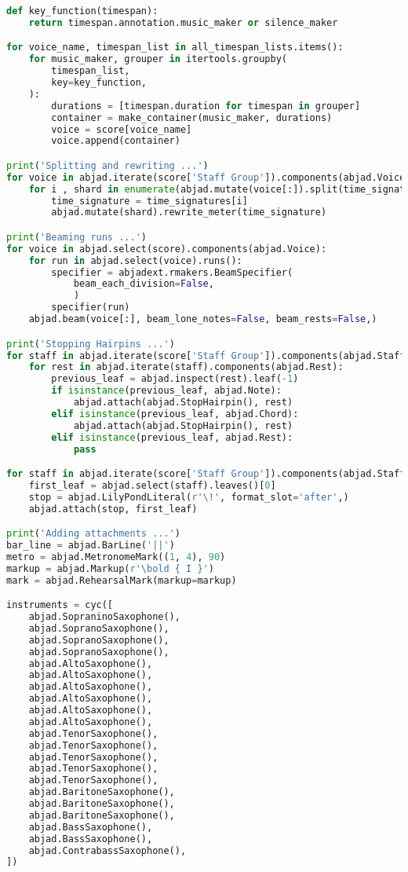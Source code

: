 \begin{lstlisting}[language=Python, caption=Invocation Source Code]
def key_function(timespan):
    return timespan.annotation.music_maker or silence_maker

for voice_name, timespan_list in all_timespan_lists.items():
    for music_maker, grouper in itertools.groupby(
        timespan_list,
        key=key_function,
    ):
        durations = [timespan.duration for timespan in grouper]
        container = make_container(music_maker, durations)
        voice = score[voice_name]
        voice.append(container)

print('Splitting and rewriting ...')
for voice in abjad.iterate(score['Staff Group']).components(abjad.Voice):
    for i , shard in enumerate(abjad.mutate(voice[:]).split(time_signatures)):
        time_signature = time_signatures[i]
        abjad.mutate(shard).rewrite_meter(time_signature)

print('Beaming runs ...')
for voice in abjad.select(score).components(abjad.Voice):
    for run in abjad.select(voice).runs():
        specifier = abjadext.rmakers.BeamSpecifier(
            beam_each_division=False,
            )
        specifier(run)
    abjad.beam(voice[:], beam_lone_notes=False, beam_rests=False,)

print('Stopping Hairpins ...')
for staff in abjad.iterate(score['Staff Group']).components(abjad.Staff):
    for rest in abjad.iterate(staff).components(abjad.Rest):
        previous_leaf = abjad.inspect(rest).leaf(-1)
        if isinstance(previous_leaf, abjad.Note):
            abjad.attach(abjad.StopHairpin(), rest)
        elif isinstance(previous_leaf, abjad.Chord):
            abjad.attach(abjad.StopHairpin(), rest)
        elif isinstance(previous_leaf, abjad.Rest):
            pass

for staff in abjad.iterate(score['Staff Group']).components(abjad.Staff):
    first_leaf = abjad.select(staff).leaves()[0]
    stop = abjad.LilyPondLiteral(r'\!', format_slot='after',)
    abjad.attach(stop, first_leaf)

print('Adding attachments ...')
bar_line = abjad.BarLine('||')
metro = abjad.MetronomeMark((1, 4), 90)
markup = abjad.Markup(r'\bold { I }')
mark = abjad.RehearsalMark(markup=markup)

instruments = cyc([
    abjad.SopraninoSaxophone(),
    abjad.SopranoSaxophone(),
    abjad.SopranoSaxophone(),
    abjad.SopranoSaxophone(),
    abjad.AltoSaxophone(),
    abjad.AltoSaxophone(),
    abjad.AltoSaxophone(),
    abjad.AltoSaxophone(),
    abjad.AltoSaxophone(),
    abjad.AltoSaxophone(),
    abjad.TenorSaxophone(),
    abjad.TenorSaxophone(),
    abjad.TenorSaxophone(),
    abjad.TenorSaxophone(),
    abjad.TenorSaxophone(),
    abjad.BaritoneSaxophone(),
    abjad.BaritoneSaxophone(),
    abjad.BaritoneSaxophone(),
    abjad.BassSaxophone(),
    abjad.BassSaxophone(),
    abjad.ContrabassSaxophone(),
])


\end{lstlisting}
